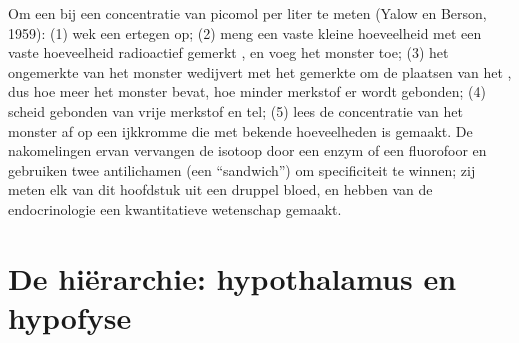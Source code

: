 \begin{method}\label{met:b3:endocrinology:ria}
Om een  bij een concentratie van picomol per liter te meten
(Yalow en Berson, 1959): (1) wek een  ertegen op; (2) meng
een vaste kleine hoeveelheid  met een vaste hoeveelheid
radioactief gemerkt , en voeg het monster toe; (3) het
ongemerkte  van het monster wedijvert met het gemerkte om de
plaatsen van het , dus hoe meer  het monster bevat,
hoe minder merkstof er wordt gebonden; (4) scheid gebonden van vrije
merkstof en tel; (5) lees de concentratie van het monster af op een
ijkkromme die met bekende hoeveelheden is gemaakt. De nakomelingen
ervan vervangen de isotoop door een enzym of een fluorofoor en
gebruiken twee antilichamen (een ``sandwich'') om specificiteit te
winnen; zij meten elk  van dit hoofdstuk uit een druppel bloed,
en hebben van de endocrinologie een kwantitatieve wetenschap gemaakt.
\end{method}

\section{De hiërarchie: hypothalamus en hypofyse}

